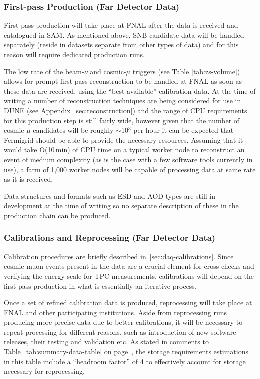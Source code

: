 \subsubsection{First-pass Production (Far Detector Data)}

First-pass
production will take place at FNAL after the data is received and catalogued in SAM.
As mentioned above, SNB candidate data will be handled separately (reside in datasets separate from
other types of data) and for this reason will require dedicated production runs.

The low rate of the beam-$\nu$ and cosmic-$\mu$ triggers (see Table \ref{tab:zs-volume}) allows for
prompt first-pass reconstruction to be handled at FNAL as soon as these data are received, using the
``best available'' calibration data. At the time of writing
a number of reconstruction techniques are being considered for use in DUNE (see Appendix~\ref{sec:reconstruction})
and the range of CPU requirements
for this production step is still fairly wide, however given that the number of cosmic-$\mu$ candidates will be roughly $\sim$10$^3$ per hour
it can be expected that Fermigrid should be able to provide the necessary resources. Assuming 
that it would take O(10\,min) of CPU time on a typical worker node to reconstruct an event of medium complexity
(as is the case with a few software tools currently in use),
a farm of 1,000 worker nodes will be capable of processing data at same rate as it is received.

Data structures and formats such as ESD and AOD-types are still in development at the time of writing so no separate
description of these in the production chain can be produced.

\subsubsection{Calibrations and Reprocessing (Far Detector Data)}
Calibration procedures are briefly described in~\ref{sec:daq-calibrations}. Since cosmic muon events present in the data
are a crucial element for cross-checks and verifying the energy scale for TPC measurements, calibrations will depend on
the first-pass production in what is essentially an iterative process.

Once a set of  refined calibration data is produced, reprocessing will take place at FNAL and other participating institutions.
Aside from reprocessing runs producing more precise data due to better calibrations, it will be necessary to repeat processing
for different reasons, such as introduction of new software releases, their testing and validation etc.
As stated in comments to Table~\ref{tab:summary-data-table} on page~\pageref{tab:summary-data-table}, the storage requirements estimations in this table include
a ``headroom factor'' of 4 to effectively account for storage necessary for reprocessing.


